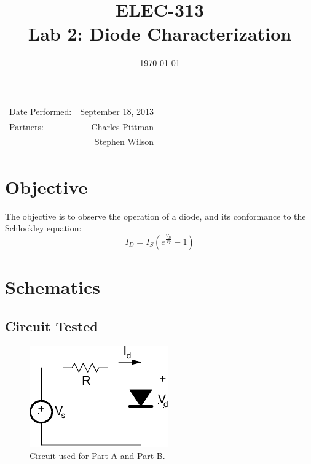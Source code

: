 \documentclass{article}
\author{}
\title{ELEC-313 \\ Lab 2: Diode Characterization \\ }
\date{\today}
\begin{document}
\maketitle

\begin{center}
  \begin{tabular}{lr}
    Date Performed: & September 18, 2013 \\
    Partners: & Charles Pittman \\
    & Stephen Wilson \\
  \end{tabular}
\end{center}

\pagebreak


\renewcommand{\labelenumi}{\alph{enumi}.}

\section{Objective}
\label{sec:objective}

The objective is to observe the operation of a diode, and its
conformance to the Schlockley equation:
\[I_D = I_S \left(e^{\frac{V_D}{V_T}} - 1\right)\]

\section{Schematics}
\label{sec:schematics}

\subsection*{Circuit Tested}
\label{sec:ckt_tested}

\begin{figure}[hbtp]
  \begin{center}
    \includegraphics[]{img/circuit1}
  \end{center}
  \caption{\label{fig:circuit1} Circuit used for Part A and Part B.}
\end{figure}
\end{document}
